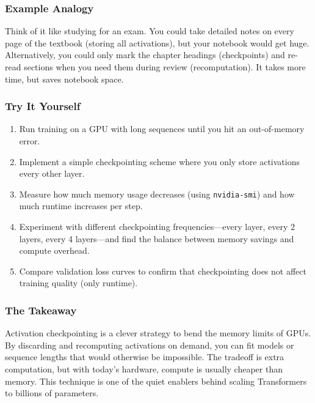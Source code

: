 \documentclass[
  letterpaper,
  DIV=11,
  numbers=noendperiod]{scrreprt}
\providecommand{\tightlist}{%
  \setlength{\itemsep}{0pt}\setlength{\parskip}{0pt}}
\begin{document}
\subsubsection{Example Analogy}\label{example-analogy}

Think of it like studying for an exam. You could take detailed notes on
every page of the textbook (storing all activations), but your notebook
would get huge. Alternatively, you could only mark the chapter headings
(checkpoints) and re-read sections when you need them during review
(recomputation). It takes more time, but saves notebook space.

\subsubsection{Try It Yourself}\label{try-it-yourself-54}

\begin{enumerate}
\def\labelenumi{\arabic{enumi}.}
\tightlist
\item
  Run training on a GPU with long sequences until you hit an
  out-of-memory error.
\item
  Implement a simple checkpointing scheme where you only store
  activations every other layer.
\item
  Measure how much memory usage decreases (using \texttt{nvidia-smi})
  and how much runtime increases per step.
\item
  Experiment with different checkpointing frequencies---every layer,
  every 2 layers, every 4 layers---and find the balance between memory
  savings and compute overhead.
\item
  Compare validation loss curves to confirm that checkpointing does not
  affect training quality (only runtime).
\end{enumerate}

\subsubsection{The Takeaway}\label{the-takeaway-55}

Activation checkpointing is a clever strategy to bend the memory limits
of GPUs. By discarding and recomputing activations on demand, you can
fit models or sequence lengths that would otherwise be impossible. The
tradeoff is extra computation, but with today's hardware, compute is
usually cheaper than memory. This technique is one of the quiet enablers
behind scaling Transformers to billions of parameters.
\end{document}

